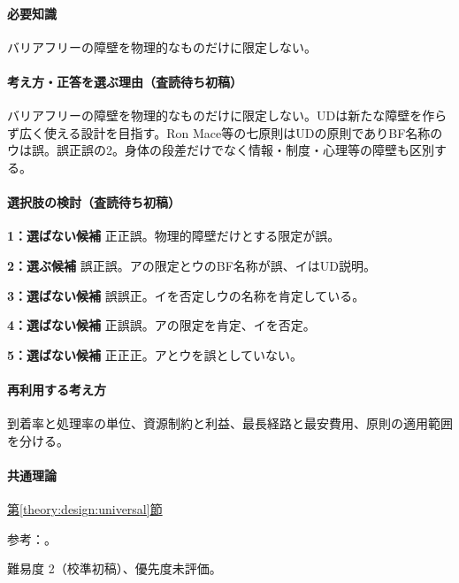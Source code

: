 \paragraph{必要知識} バリアフリーの障壁を物理的なものだけに限定しない。

\paragraph{考え方・正答を選ぶ理由（査読待ち初稿）} バリアフリーの障壁を物理的なものだけに限定しない。UDは新たな障壁を作らず広く使える設計を目指す。Ron Mace等の七原則はUDの原則でありBF名称のウは誤。誤正誤の2。身体の段差だけでなく情報・制度・心理等の障壁も区別する。

\paragraph{選択肢の検討（査読待ち初稿）}\mbox{}\par

\noindent\textbf{1：選ばない候補} 正正誤。物理的障壁だけとする限定が誤。\par

\noindent\textbf{2：選ぶ候補} 誤正誤。アの限定とウのBF名称が誤、イはUD説明。\par

\noindent\textbf{3：選ばない候補} 誤誤正。イを否定しウの名称を肯定している。\par

\noindent\textbf{4：選ばない候補} 正誤誤。アの限定を肯定、イを否定。\par

\noindent\textbf{5：選ばない候補} 正正正。アとウを誤としていない。\par

\paragraph{再利用する考え方} 到着率と処理率の単位、資源制約と利益、最長経路と最安費用、原則の適用範囲を分ける。

\paragraph{共通理論} \hyperref[theory:design:universal]{第\ref*{theory:design:universal}節}

\par 参考：\cite{design48_ud}。

\par 難易度 2（校準初稿）、優先度未評価。

